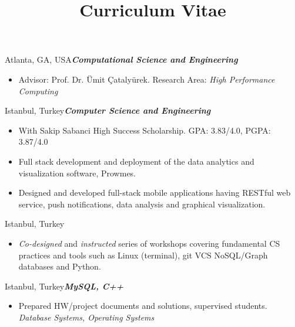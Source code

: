 \documentclass[11pt,letterpaper,sans]{moderncv}
\title{Curriculum Vitae}
\begin{document}
\makecvtitle
\vspace*{-10mm}     %


    {Atlanta, GA, USA}{\small{\textit{\textbf{Computational Science and Engineering}}}}{
        \begin{itemize}
            \item Advisor: Prof. Dr. Ümit Çatalyürek. Research Area: \textit{High
            Performance Computing}
        \end{itemize}
    }
    {Istanbul, Turkey}{\textit{\textbf{Computer Science and Engineering}}}{
        \begin{itemize}
            \item With Sakip Sabanci High Success Scholarship. GPA: 3.83/4.0,
            PGPA: 3.87/4.0
        \end{itemize}}

    {}{
        \begin{itemize}
        \item Full stack development and deployment of the data analytics and visualization
        software, Prowmes.
        \end{itemize}
    }
    {}{
        \begin{itemize}
        \item Designed and developed full-stack mobile applications having RESTful
        web service, push notifications, data analysis and graphical visualization.
        \end{itemize}
    }

    {Istanbul, Turkey}{}{
        \begin{itemize}
        \item \textit{Co-designed} and \textit{instructed} series of workshops covering
        fundamental CS practices and tools such as Linux (terminal), git VCS NoSQL/Graph
        databases and Python. 
        \end{itemize}
    }
    {Istanbul, Turkey}{\footnotesize{\textbf{\emph{MySQL, C++}}}}{
        \begin{itemize}
        \item Prepared HW/project documents and solutions, supervised students. \textit{Database Systems, Operating Systems}
        \end{itemize}
    }
\end{document}
